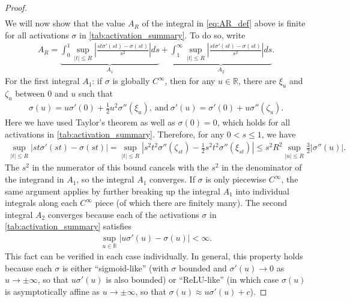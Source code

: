 \documentclass{article}
\newcommand{\R}{\mathbb{R}}
\begin{document}
\begin{appendices}
\begin{proof}
\begin{align}
    \end{align}
    We will now show that the value $A_R$ of the integral in \eqref{eq:AR_def} above is finite for all activations $\sigma$ in \cref{tab:activation_summary}. To do so, write
    \begin{align}
        A_R = \underbrace{\int_0^1 \sup_{|t| \leq R} \left| \frac{st \sigma'(st) - \sigma(st)}{s^2} \right| ds}_{A_1} +  \underbrace{\int_1^\infty \sup_{|t| \leq R} \left| \frac{st \sigma'(st) - \sigma(st)}{s^2} \right| ds}_{A_2}. \label{eq:AR_A1_A2}
    \end{align}
    For the first integral $A_1$: if $\sigma$ is globally $C^\infty$, then for any $u \in \R$, there are $\xi_u$ and $\zeta_u$ between 0 and $u$ such that
    \begin{align}
        \sigma(u) = u \sigma'(0) + \frac{1}{2} u^2 \sigma''(\xi_u), \  \textrm{and} \ \sigma'(u) = \sigma'(0) + u \sigma''(\zeta_u).
    \end{align}
    Here we have used Taylor's theorem as well as $\sigma(0) = 0$, which holds for all activations in \cref{tab:activation_summary}. Therefore, for any $0 < s \leq 1$, we have
    \begin{align}
        \sup_{|t| \leq R} |st \sigma'(st) - \sigma(st)| = \sup_{|t| \leq R} \left| s^2 t^2 \sigma''(\zeta_{st}) - \frac{1}{2} s^2 t^2 \sigma''(\xi_{st}) \right| \leq s^2 R^2 \sup_{|u| \leq R} \frac{3}{2} |\sigma''(u)|.
    \end{align}
    The $s^2$ in the numerator of this bound cancels with the $s^2$ in the denominator of the integrand in $A_1$, so the integral $A_1$ converges. If $\sigma$ is only piecewise $C^\infty$, the same argument applies by further breaking up the integral $A_1$ into individual integrals along each $C^\infty$ piece (of which there are finitely many). The second integral $A_2$ converges because each of the activations $\sigma$ in \cref{tab:activation_summary} satisfies
    \begin{align}
        \sup_{u \in \R} |u \sigma'(u) - \sigma(u)| < \infty.
    \end{align}
    This fact can be verified in each case individually. In general, this property holds because each $\sigma$ is either ``sigmoid-like'' (with $\sigma$ bounded and $\sigma'(u) \to 0$ as $u \to \pm \infty$, so that $u \sigma'(u)$ is also bounded) or ``ReLU-like'' (in which case $\sigma(u)$ is asymptotically affine as $u \to \pm \infty$, so that $\sigma(u) \approx u \sigma'(u) + c$).



\end{proof}
\end{appendices}
\end{document}
